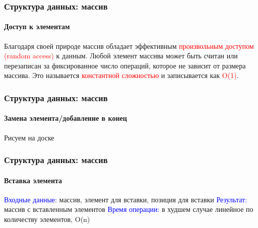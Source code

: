 \documentclass[aspectratio=169]{beamer}
\begin{document}
\begin{frame}
\frametitle{Структура данных: массив}
\framesubtitle{Доступ к элементам}
\justifying
\small
Благодаря своей природе массив обладает эффективным \textcolor{red}{произвольным доступом (random access)} к данным. Любой элемент массива может быть считан или перезаписан за фиксированное число операций, которое не зависит от размера массива. Это называется \textcolor{red}{константной сложностью} и записывается как \textcolor{red}{O(1)}.\newline
\begin{figure}
    \captionsetup[subfigure]{labelformat=empty}
    \centering
\end{figure}
\end{frame}

\begin{frame}
\frametitle{Структура данных: массив}
\framesubtitle{Замена элемента/добавление в конец}
\justifying
\small
Рисуем на доске
\end{frame}

\begin{frame}
\frametitle{Структура данных: массив}
\framesubtitle{Вставка элемента}
\justifying
\small
\textcolor{blue}{Входные данные:} массив, элемент для вставки, позиция для вставки\newline
\textcolor{blue}{Результат:} массив с вставленным элементов\newline
\textcolor{blue}{Время операции:} в худшем случае линейное по количеству элементов, O(n)
\begin{figure}
    \captionsetup[subfigure]{labelformat=empty}
    \centering
\end{figure}
\end{frame}
\end{document}
